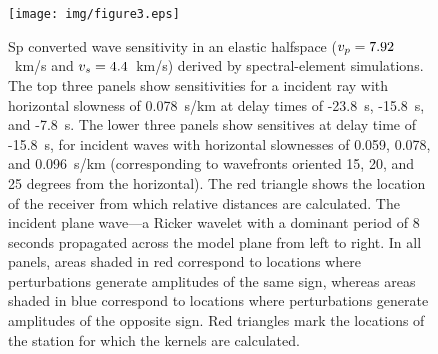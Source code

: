 \documentclass[referee]{gji}
\begin{document}
\begin{figure}
\centering
\texttt{[image: img/figure3.eps]}
\caption{Sp converted wave sensitivity in an elastic halfspace ($v_p=7.92$~km/s and $v_s=4.4$~km/s) derived by spectral-element simulations.  The top three panels show sensitivities for a incident ray with horizontal slowness of 0.078~s/km at delay times of -23.8~s, -15.8~s, and -7.8~s. The lower three panels show sensitives at delay time of -15.8~s, for incident waves with horizontal slownesses of 0.059, 0.078, and 0.096~s/km (corresponding to wavefronts oriented 15, 20, and 25 degrees from the horizontal).  The red triangle shows the location of the receiver from which relative distances are calculated.  The incident plane wave---a Ricker wavelet with a dominant period of 8 seconds propagated across the model plane from left to right.  In all panels, areas shaded in red correspond to locations where perturbations generate amplitudes of the same sign, whereas areas shaded in blue correspond to locations where perturbations generate amplitudes of the opposite sign.  Red triangles mark the locations of the station for which the kernels are calculated.}
\label{fig:KernelsTime}
\end{figure}
\end{document}
